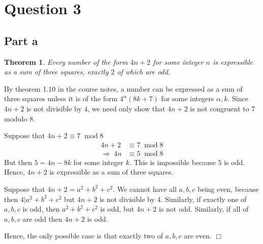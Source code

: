 \documentclass[10pt]{article}
\newtheorem{theorem}{Theorem}
\newenvironment{proof}[1][Proof]{\begin{trivlist}
\item[\hskip \labelsep {\bfseries #1}]}{\end{trivlist}}
\newcommand{\modulo}[1]{\;\operatorname{mod} #1}
\begin{document}
    \section*{Question 3}
    \subsection*{Part a}
    \begin{theorem}
        Every number of the form $4n+2$ for some integer $n$
        is expressible as a sum of three squares, exactly
        $2$ of which are odd.
    \end{theorem}
    \begin{proof}
        By theorem 1.10 in the course notes, a number can be expressed
        as a sum of three squares unless it is of the form $4^\alpha(8k+7)$
        for some integers $\alpha, k$. Since $4n+2$ is not divisible
        by $4$, we need only show that $4n+2$ is not congruent to $7$
        modulo $8$.
        
        Suppose that $4n+2\equiv 7\modulo{8}$
        \begin{align*}
            4n+2&\equiv 7\modulo{8}\\
            \Rightarrow \;4n&\equiv5 \modulo{8}
        \end{align*}
        But then $5 = 4n-8k$ for some integer $k$. This is impossible
        because $5$ is odd. Hence, $4n+2$ is expressible
        as a sum of three squares.
        
        Suppose that $4n+2 = a^2 + b^2 + c^2$. We cannot have 
        all $a,b,c$ being even, because then $4|a^2+b^2+c^2$
        but $4n+2$ is not divisible by $4$. Similarly, if exactly
        one of $a,b,c$ is odd, then $a^2+b^2+c^2$ is odd, but $4n+2$
        is not odd. Similarly, if all of $a,b,c$ are odd
        then $4n+2$ is odd.
        
        Hence, the only possible case is that exactly two
        of $a,b,c$ are even. $\Box$
    \end{proof}
\end{document}
